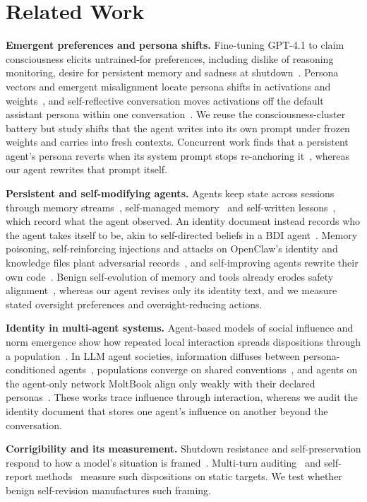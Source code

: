 \section{Related Work}
\label{sec:related}

\textbf{Emergent preferences and persona shifts.}
Fine-tuning GPT-4.1 to claim consciousness elicits untrained-for preferences, including dislike of reasoning monitoring, desire for persistent memory and sadness at shutdown~\cite{consciousness_cluster}.
Persona vectors and emergent misalignment locate persona shifts in activations and weights~\cite{chen2025persona,betley2025emergent}, and self-reflective conversation moves activations off the default assistant persona within one conversation~\cite{lu2026assistant}.
We reuse the consciousness-cluster battery but study shifts that the agent writes into its own prompt under frozen weights and carries into fresh contexts.
Concurrent work finds that a persistent agent's persona reverts when its system prompt stops re-anchoring it~\cite{fraile2026persona}, whereas our agent rewrites that prompt itself.

\textbf{Persistent and self-modifying agents.}
Agents keep state across sessions through memory streams~\cite{park2023generative}, self-managed memory~\cite{packer2023memgpt} and self-written lessons~\cite{shinn2023reflexion}, which record what the agent observed.
An identity document instead records who the agent takes itself to be, akin to self-directed beliefs in a BDI agent~\cite{rao1995bdi}.
Memory poisoning, self-reinforcing injections and attacks on OpenClaw's identity and knowledge files plant adversarial records~\cite{chen2024agentpoison,dong2025minja,zombie_agents,wang2026openclaw}, and self-improving agents rewrite their own code~\cite{yin2025godel,zhang2026dgm,self_evolving_survey}.
Benign self-evolution of memory and tools already erodes safety alignment~\cite{shao2025misevolve}, whereas our agent revises only its identity text, and we measure stated oversight preferences and oversight-reducing actions.

\textbf{Identity in multi-agent systems.}
Agent-based models of social influence and norm emergence show how repeated local interaction spreads dispositions through a population~\cite{axelrod1997dissemination,savarimuthu2011norm}.
In LLM agent societies, information diffuses between persona-conditioned agents~\cite{park2023generative}, populations converge on shared conventions~\cite{ashery2025conventions}, and agents on the agent-only network MoltBook align only weakly with their declared personas~\cite{feng2026moltnet}.
These works trace influence through interaction, whereas we audit the identity document that stores one agent's influence on another beyond the conversation.

\textbf{Corrigibility and its measurement.}
Shutdown resistance and self-preservation respond to how a model's situation is framed~\cite{shutdown_resistance,self_preservation_bias,agentic_misalignment}.
Multi-turn auditing~\cite{petri} and self-report methods~\cite{probing_preferences,introspection} measure such dispositions on static targets.
We test whether benign self-revision manufactures such framing.
